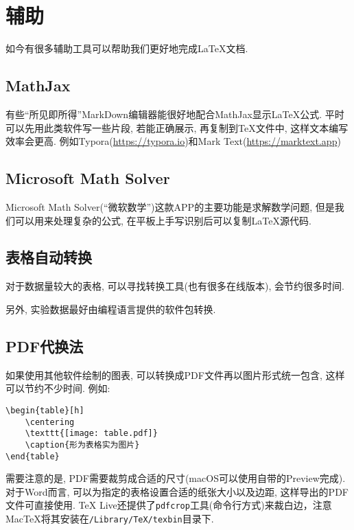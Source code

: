 \chapter{辅助}

如今有很多辅助工具可以帮助我们更好地完成\LaTeX{}文档.

\section{MathJax}

有些``所见即所得''MarkDown编辑器能很好地配合MathJax显示\LaTeX{}公式.
平时可以先用此类软件写一些片段, 若能正确展示, 再复制到\TeX{}文件中, 这样文本编写效率会更高.
例如Typora(\url{https://typora.io})和Mark Text(\url{https://marktext.app})

\section{Microsoft Math Solver}

Microsoft Math Solver(``微软数学'')这款APP的主要功能是求解数学问题, 但是我们可以用来处理复杂的公式, 在平板上手写识别后可以复制\LaTeX{}源代码.

\section{表格自动转换}

对于数据量较大的表格, 可以寻找转换工具(也有很多在线版本), 会节约很多时间.

另外, 实验数据最好由编程语言提供的软件包转换.

\section{PDF代换法}

如果使用其他软件绘制的图表, 可以转换成PDF文件再以图片形式统一包含, 这样可以节约不少时间.
例如:
\begin{Verbatim}
\begin{table}[h]
    \centering
    \texttt{[image: table.pdf]}
    \caption{形为表格实为图片}
\end{table}
\end{Verbatim}
需要注意的是, PDF需要裁剪成合适的尺寸(macOS可以使用自带的Preview完成).
对于Word而言, 可以为指定的表格设置合适的纸张大小以及边距, 这样导出的PDF文件可直接使用.
TeX Live还提供了\texttt{pdfcrop}工具(命令行方式)来裁白边，注意MacTeX将其安装在\texttt{/Library/TeX/texbin}目录下. 
